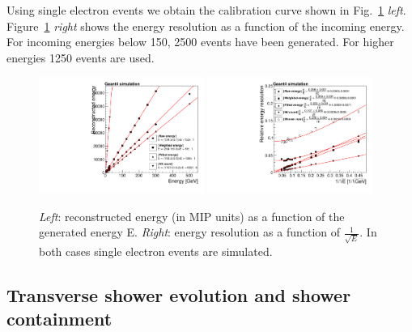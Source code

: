 Using single electron events we obtain
the calibration curve shown in Fig.~\ref{fig:baselinelinandresol}
{\em left}. Figure~\ref{fig:baselinelinandresol} {\em right} shows the energy
resolution as a function of the incoming energy. For incoming energies
below 150\GeV, 2500 events have been generated. For higher energies
1250 events are used.

\begin{figure}[h!]
  \begin{center}
   \includegraphics[width=0.48\textwidth]{figures/e_calibFit.pdf}
    \includegraphics[width=0.48\textwidth]{figures/e_resoFit.pdf}
    \caption{{\em Left}: reconstructed energy (in MIP units) as a function of the generated
      energy E. {\em Right}: energy resolution as a function of
      $\frac{1}{\sqrt{E}}$. In both cases single electron events are simulated.}
    \label{fig:baselinelinandresol}
  \end{center}
\end{figure}


\subsection{Transverse shower evolution and shower containment}
\label{subsec:transvevol}

